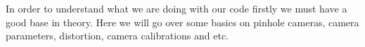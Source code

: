 In order to understand what we are doing with our code firstly we must have a good base in theory. Here we will go over some basics on pinhole cameras, camera parameters, distortion, camera calibrations and etc. 